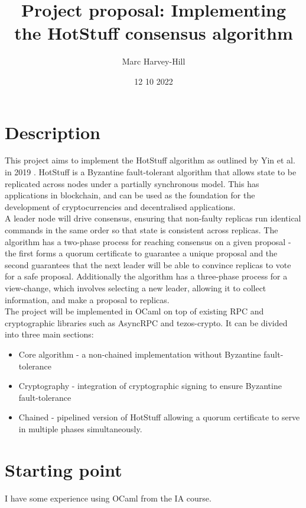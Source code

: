 \documentclass[a4paper]{article}
\begin{document}
\title{
{Project proposal: Implementing the HotStuff consensus algorithm}\\
}
\author{Marc Harvey-Hill}
\date{12 10 2022}
\frenchspacing

\maketitle

\section{Description}
This project aims to implement the HotStuff algorithm as outlined by Yin et al. in 2019 \cite{yin2019hotstuff}. HotStuff is a Byzantine fault-tolerant algorithm that allows state to be replicated across nodes under a partially synchronous model. This has applications in blockchain, and can be used as the foundation for the development of cryptocurrencies and decentralised applications.\\
A leader node will drive consensus, ensuring that non-faulty replicas run identical commands in the same order so that state is consistent across replicas. The algorithm has a two-phase process for reaching consensus on a given proposal - the first forms a quorum certificate to guarantee a unique proposal and the second guarantees that the next leader will be able to convince replicas to vote for a safe proposal. Additionally the algorithm has a three-phase process for a view-change, which involves selecting a new leader, allowing it to collect information, and make a proposal to replicas.\\
The project will be implemented in OCaml on top of existing RPC and cryptographic libraries such as AsyncRPC and tezos-crypto. It can be divided into three main sections:
\begin{itemize}
	\item Core algorithm - a non-chained implementation without Byzantine fault-tolerance
	\item Cryptography - integration of cryptographic signing to ensure Byzantine fault-tolerance
	\item Chained - pipelined version of HotStuff allowing a quorum certificate to serve in multiple phases simultaneously.
\end{itemize}


\section{Starting point}
I have some experience using OCaml from the IA course.
\end{document}
